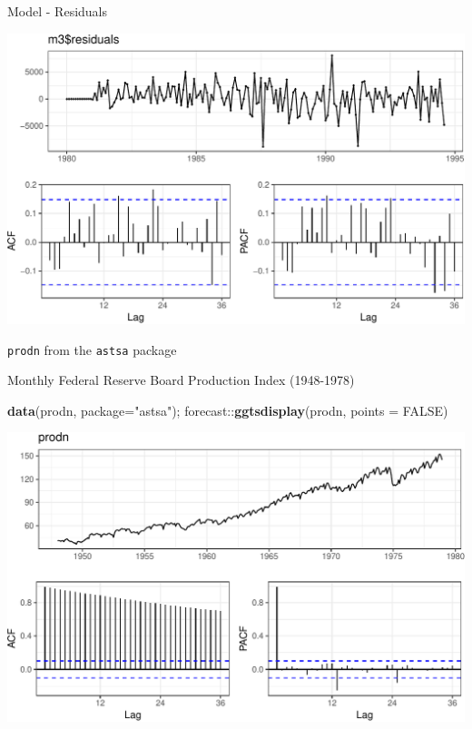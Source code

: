 \documentclass[11pt,ignorenonframetext,]{beamer}
\newenvironment{Shaded}{}{}
\newcommand{\DataTypeTok}[1]{\textcolor[rgb]{0.56,0.13,0.00}{#1}}
\newcommand{\KeywordTok}[1]{\textcolor[rgb]{0.00,0.44,0.13}{\textbf{#1}}}
\newcommand{\NormalTok}[1]{#1}
\newcommand{\OperatorTok}[1]{\textcolor[rgb]{0.40,0.40,0.40}{#1}}
\newcommand{\OtherTok}[1]{\textcolor[rgb]{0.00,0.44,0.13}{#1}}
\newcommand{\StringTok}[1]{\textcolor[rgb]{0.25,0.44,0.63}{#1}}
\let\oldShaded\Shaded
\let\endoldShaded\endShaded
\renewenvironment{Shaded}{\footnotesize\begin{spacing}{0.9}\oldShaded}{\endoldShaded\end{spacing}}
\begin{document}
\begin{frame}{%
\protect\hypertarget{model---residuals}{%
Model - Residuals}}

\begin{center}\includegraphics[width=\textwidth]{Lec11_files/figure-beamer/unnamed-chunk-14-1} \end{center}

\end{frame}

\begin{frame}[fragile]{%
\protect\hypertarget{from-the-package}{%
\texttt{prodn} from the \texttt{astsa} package}}

Monthly Federal Reserve Board Production Index (1948-1978)

\begin{Shaded}
\begin{Highlighting}[]
\KeywordTok{data}\NormalTok{(prodn, }\DataTypeTok{package=}\StringTok{"astsa"}\NormalTok{); forecast}\OperatorTok{::}\KeywordTok{ggtsdisplay}\NormalTok{(prodn, }\DataTypeTok{points =} \OtherTok{FALSE}\NormalTok{)}
\end{Highlighting}
\end{Shaded}

\begin{center}\includegraphics[width=\textwidth]{Lec11_files/figure-beamer/unnamed-chunk-15-1} \end{center}

\end{frame}
\end{document}
